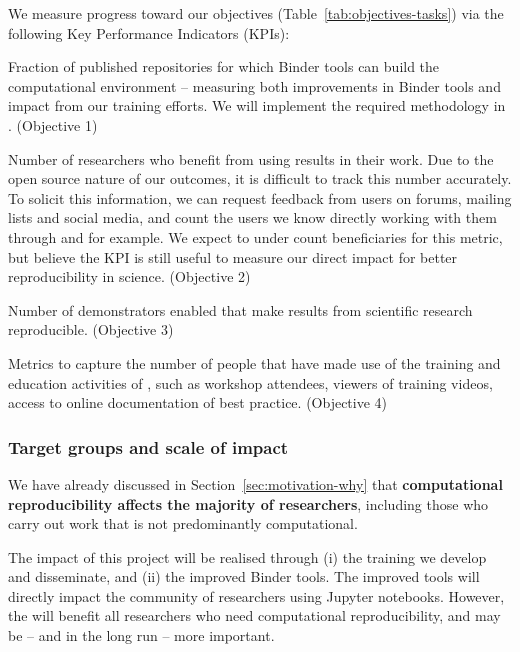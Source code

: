 We measure progress toward our objectives (Table~\ref{tab:objectives-tasks})
via the following Key Performance Indicators (KPIs):
\begin{compactenum}
\item \label{kpi:reproducibility} Fraction of published repositories for
  which Binder tools can build the computational environment -- measuring both
  improvements in Binder tools and impact from our training efforts. We will
  implement the required methodology in
  . (Objective 1)
\item \label{kpi:broaden} Number of researchers who benefit from using
  \TheProject{} results in their work. Due to the open source nature of our
  outcomes, it is difficult to track this number accurately. To solicit this
  information, we can request feedback from users on forums, mailing lists and
  social media, and count the users we know directly working with
  them through  and  for example. We expect
  to under count beneficiaries for this metric, but believe the KPI is still useful
  to measure our direct impact for better reproducibility in science. (Objective 2)
\item \label{kpi:demonstrators} Number of demonstrators enabled that make
  results from scientific research reproducible. (Objective 3)
\item \label{kpi:education} Metrics to capture the number of people that have
  made use of the training and education activities of \TheProject{}, such as
  workshop attendees, viewers of training videos, access to online documentation
  of best practice. (Objective 4)%
\end{compactenum}


\subsubsection{Target groups and scale of impact}\label{sec:target-groups-and-scale-of-impact}

We have already discussed in Section~\ref{sec:motivation-why} that
\textbf{computational reproducibility affects the majority of researchers},
including those who carry out work that is not predominantly computational.

The impact of this project will be realised through (i) the training we develop
and disseminate, and (ii) the improved Binder tools. The improved tools will
directly impact the community of researchers using Jupyter notebooks. However,
the  will benefit all researchers who need computational reproducibility, and
may be -- and in the long run -- more important.

